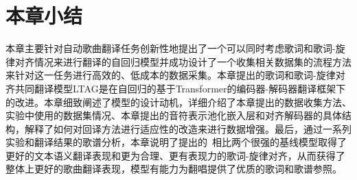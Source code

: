 \section{本章小结}
本章主要针对自动歌曲翻译任务创新性地提出了一个可以同时考虑歌词和歌词-旋律对齐情况来进行翻译的自回归模型并成功设计了一个收集相关数据集的流程方法来针对这一任务进行高效的、低成本的数据采集。本章提出的歌词和歌词-旋律对齐共同翻译模型LTAG是在自回归的基于Transformer的编码器-解码器翻译框架下的改进。本章细致阐述了模型的设计动机，详细介绍了本章提出的数据收集方法、实验中使用的数据集情况、本章提出的音符表示池化嵌入层和对齐解码器的具体结构，解释了如何对回译方法进行适应性的改造来进行数据增强。最后，通过一系列实验和翻译结果的歌谱分析，本章说明了提出的\modelname~相比两个很强的基线模型取得了更好的文本语义翻译表现和更为合理、更有表现力的歌词-旋律对齐，从而获得了整体上更好的歌曲翻译表现，模型有能力为翻唱提供了优质的歌词和歌谱参照。
